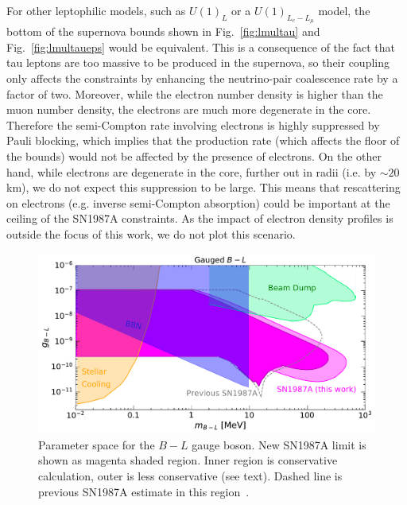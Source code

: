 \documentclass[11pt]{article}
\begin{document}
For other leptophilic models, such as $U(1)_L$ or a $U(1)_{L_e-L_\mu}$ model, the bottom of the supernova bounds shown in Fig.~\ref{fig:lmultau} and Fig.~\ref{fig:lmultaueps} would be equivalent. This is a consequence of the fact that tau leptons are too massive to be produced in the supernova, so their coupling only affects the constraints by enhancing the neutrino-pair coalescence rate by a factor of two. Moreover, while the electron number density is higher than the muon number density, the electrons are much more degenerate in the core. Therefore the semi-Compton rate involving electrons is highly suppressed by Pauli blocking, which implies that the production rate (which affects the floor of the bounds) would not be affected by the presence of electrons. On the other hand,  while electrons are degenerate in the core, further out in radii (i.e. by $\sim 20$km), we do not expect this suppression to be large. This means that rescattering on electrons (e.g. inverse semi-Compton absorption) could be important at the ceiling of the SN1987A constraints. As the impact of electron density profiles is outside the focus of this work, we do not plot this scenario.


\begin{figure}
  \includegraphics[width=\columnwidth]{bl} \caption{Parameter space for the $B-L$ gauge boson. New SN1987A limit is shown as magenta shaded region. Inner region is conservative calculation, outer is less conservative (see text). Dashed line is previous SN1987A estimate in this region~\cite{Knapen:2017xzo}.  }
  \label{fig:bl}
\end{figure}
\end{document}
